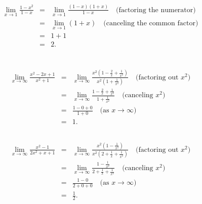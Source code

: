 \documentclass{article}
\begin{document}
\section{}
						\subsection{}
\[
\begin{array}{rcl}
	\lim_{x \to 1} \frac{1 - x^2}{1 - x} 
	& = & \lim_{x \to 1} \frac{(1 - x)(1 + x)}{1 - x} \quad \text{(factoring the numerator)} \\
	& = & \lim_{x \to 1} (1 + x) \quad \text{(canceling the common factor)} \\
	& = & 1 + 1 \\
	& = & 2.
\end{array}
\]
					\section{}
						\subsection{}
\[
\begin{array}{rcl}
	\lim_{x \to \infty} \frac{x^2 - 2x + 1}{x^2 + 1} 
	& = & \lim_{x \to \infty} \frac{x^2(1 - \frac{2}{x} + \frac{1}{x^2})}{x^2(1 + \frac{1}{x^2})} \quad \text{(factoring out } x^2 \text{)} \\
	& = & \lim_{x \to \infty} \frac{1 - \frac{2}{x} + \frac{1}{x^2}}{1 + \frac{1}{x^2}} \quad \text{(canceling } x^2 \text{)} \\
	& = & \frac{1 - 0 + 0}{1 + 0} \quad \text{(as } x \to \infty \text{)} \\
	& = & 1.
\end{array}
\]

						\subsection{}
\[
\begin{array}{rcl}
	\lim_{x \to \infty} \frac{x^2 - 1}{2x^2 + x + 1} 
	& = & \lim_{x \to \infty} \frac{x^2(1 - \frac{1}{x^2})}{x^2(2 + \frac{1}{x} + \frac{1}{x^2})} \quad \text{(factoring out } x^2 \text{)} \\
	& = & \lim_{x \to \infty} \frac{1 - \frac{1}{x^2}}{2 + \frac{1}{x} + \frac{1}{x^2}} \quad \text{(canceling } x^2 \text{)} \\
	& = & \frac{1 - 0}{2 + 0 + 0} \quad \text{(as } x \to \infty \text{)} \\
	& = & \frac{1}{2}.
\end{array}
\]
\end{document}
